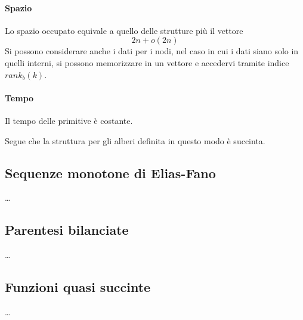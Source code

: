 \paragraph{Spazio}
Lo spazio occupato equivale a quello delle strutture più il vettore
 $$2n + o(2n)$$
Si possono considerare anche i dati per i nodi, nel caso in cui 
i dati siano solo in quelli interni, si possono memorizzare in un vettore 
e accedervi tramite indice $\mathit{rank}_b(k)$.

\paragraph{Tempo}
Il tempo delle primitive è costante.

Segue che la struttura per gli alberi definita in questo modo è succinta.

\subsection{Sequenze monotone di Elias-Fano}
\dots
\subsection{Parentesi bilanciate}
\dots
\subsection{Funzioni quasi succinte}
\dots

